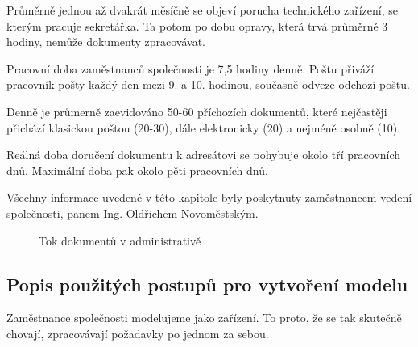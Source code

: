 \documentclass[12pt,a4paper]{article}
\begin{document}
Průměrně jednou až dvakrát měsíčně se objeví porucha technického zařízení, se kterým pracuje sekretářka. Ta potom po dobu opravy, která trvá průměrně 3 hodiny, nemůže dokumenty zpracovávat.

Pracovní doba zaměstnanců společnosti je 7,5 hodiny denně. Poštu přiváží pracovník pošty každý den mezi 9. a 10. hodinou, současně odveze odchozí poštu.

Denně je průmerně zaevidováno 50-60 příchozích dokumentů, které nejčastěji při\-chá\-zí klasickou poštou (20-30), dále elektronicky (20) a nejméně osobně (10).

Reálná doba doručení dokumentu k adresátovi se pohybuje okolo tří pracovních dnů. Maximální doba pak okolo pěti pracovních dnů.

Všechny informace uvedené v této kapitole byly poskytnuty zaměstnancem vedení spo\-leč\-nos\-ti, panem Ing. Oldřichem Novoměstským.

\begin{figure}[ht]
 \begin{center}
	\caption{Tok dokumentů v administrativě}
	\label{tok_dokumentu}
 \end{center}
\end{figure}

\subsection{Popis použitých postupů pro vytvoření modelu}

Zaměstnance společnosti modelujeme jako zařízení. To proto, že se tak skutečně chovají, zpracovávají požadavky po jednom za sebou.
\end{document}
